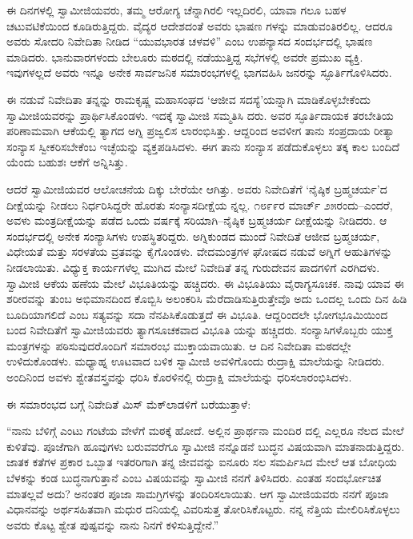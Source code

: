 ಈ ದಿನಗಳಲ್ಲಿ ಸ್ವಾಮೀಜಿಯವರು, ತಮ್ಮ ಆರೋಗ್ಯ ಚೆನ್ನಾಗಿರಲಿ ಇಲ್ಲದಿರಲಿ, ಯಾವಾ ಗಲೂ ಬಹಳ ಚಟುವಟಿಕೆಯಿಂದ ಕೂಡಿರುತ್ತಿದ್ದರು. ವೈದ್ಯರ ಆದೇಶದಂತೆ ಅವರು ಭಾಷಣ ಗಳನ್ನು ಮಾಡುವಂತಿರಲಿಲ್ಲ. ಆದರೂ ಅವರು ಸೋದರಿ ನಿವೇದಿತಾ ನೀಡಿದ “ಯುವಭಾರತ ಚಳವಳಿ” ಎಂಬ ಉಪನ್ಯಾಸದ ಸಂದರ್ಭದಲ್ಲಿ ಭಾಷಣ ಮಾಡಿದರು. ಭಾನುವಾರಗಳಂದು ಬೇಲೂರು ಮಠದಲ್ಲಿ ನಡೆಯುತ್ತಿದ್ದ ಸಭೆಗಳಲ್ಲಿ ಅವರೇ ಪ್ರಮುಖ ವ್ಯಕ್ತಿ. ಇವುಗಳಲ್ಲದೆ ಅವರು ಇನ್ನೂ ಅನೇಕ ಸಾರ್ವಜನಿಕ ಸಮಾರಂಭಗಳಲ್ಲಿ ಭಾಗವಹಿಸಿ ಜನರನ್ನು ಸ್ಫೂರ್ತಿಗೊಳಿಸಿದರು.

ಈ ನಡುವೆ ನಿವೇದಿತಾ ತನ್ನನ್ನು ರಾಮಕೃಷ್ಣ ಮಹಾಸಂಘದ ‘ಆಜೀವ ಸದಸ್ಯೆ’ಯನ್ನಾಗಿ ಮಾಡಿಕೊಳ್ಳಬೇಕೆಂದು ಸ್ವಾಮೀಜಿಯವರನ್ನು ಪ್ರಾರ್ಥಿಸಿಕೊಂಡಳು. ಇದಕ್ಕೆ ಸ್ವಾಮೀಜಿ ಸಮ್ಮತಿಸಿ ದರು. ಅವರ ಸ್ಫೂರ್ತಿದಾಯಕ ತರಬೇತಿಯ ಪರಿಣಾಮವಾಗಿ ಆಕೆಯಲ್ಲಿ ತ್ಯಾಗದ ಅಗ್ನಿ ಪ್ರಜ್ವಲಿಸ ಲಾರಂಭಿಸಿತ್ತು. ಆದ್ದರಿಂದ ಅವಳೀಗ ತಾನು ಸಂಪ್ರದಾಯ ರೀತ್ಯಾ ಸಂನ್ಯಾಸ ಸ್ವೀಕರಿಸಬೇಕೆಂಬ ಇಚ್ಛೆಯನ್ನು ವ್ಯಕ್ತಪಡಿಸಿದಳು. ಈಗ ತಾನು ಸಂನ್ಯಾಸ ಪಡೆದುಕೊಳ್ಳಲು ತಕ್ಕ ಕಾಲ ಬಂದಿದೆ ಯೆಂದು ಬಹುಶಃ ಆಕೆಗೆ ಅನ್ನಿಸಿತ್ತು.

ಆದರೆ ಸ್ವಾಮೀಜಿಯವರ ಆಲೋಚನೆಯ ದಿಕ್ಕು ಬೇರೆಯೇ ಆಗಿತ್ತು. ಅವರು ನಿವೇದಿತೆಗೆ ‘ನೈಷ್ಠಿಕ ಬ್ರಹ್ಮಚರ್ಯ’ದ ದೀಕ್ಷೆಯನ್ನು ನೀಡಲು ನಿರ್ಧರಿಸಿದ್ದರೇ ಹೊರತು ಸಂನ್ಯಾಸದೀಕ್ಷೆಯ ನ್ನಲ್ಲ. ೧೮೯೯ರ ಮಾರ್ಚ್ ೨೫ರಂದು–ಎಂದರೆ, ಅವಳು ಮಂತ್ರದೀಕ್ಷೆಯನ್ನು ಪಡೆದ ಒಂದು ವರ್ಷಕ್ಕೆ ಸರಿಯಾಗಿ–ನೈಷ್ಠಿಕ ಬ್ರಹ್ಮಚರ್ಯ ದೀಕ್ಷೆಯನ್ನು ನೀಡಿದರು. ಆ ಸಂದರ್ಭದಲ್ಲಿ ಅನೇಕ ಸಂನ್ಯಾಸಿಗಳು ಉಪಸ್ಥಿತರಿದ್ದರು. ಅಗ್ನಿಕುಂಡದ ಮುಂದೆ ನಿವೇದಿತೆ ಆಜೀವ ಬ್ರಹ್ಮಚರ್ಯ, ವಿಧೇಯತೆ ಮತ್ತು ಸರಳತೆಯ ವ್ರತವನ್ನು ಕೈಗೊಂಡಳು. ವೇದಮಂತ್ರಗಳ ಘೋಷದ ನಡುವೆ ಅಗ್ನಿಗೆ ಆಹುತಿಗಳನ್ನು ನೀಡಲಾಯಿತು. ವಿಧ್ಯುಕ್ತ ಕಾರ್ಯಗಳೆಲ್ಲ ಮುಗಿದ ಮೇಲೆ ನಿವೇದಿತೆ ತನ್ನ ಗುರುದೇವನ ಪಾದಗಳಿಗೆ ಎರಗಿದಳು. ಸ್ವಾಮೀಜಿ ಆಕೆಯ ಹಣೆಯ ಮೇಲೆ ವಿಭೂತಿಯನ್ನು ಹಚ್ಚಿದರು. ಈ ವಿಭೂತಿಯು ವೈರಾಗ್ಯಸೂಚಕ. ನಾವು ಯಾವ ಈ ಶರೀರವನ್ನು ತುಂಬ ಅಭಿಮಾನದಿಂದ ಕೊಬ್ಬಿಸಿ ಅಲಂಕರಿಸಿ ಮೆರೆದಾಡಿಸುತ್ತಿರುತ್ತೇವೊ ಅದು ಒಂದಲ್ಲ ಒಂದು ದಿನ ಹಿಡಿ ಬೂದಿಯಾಗಲಿದೆ ಎಂಬ ಸತ್ಯವನ್ನು ಸದಾ ನೆನಪಿಸಿಕೊಡುತ್ತದೆ ಈ ವಿಭೂತಿ. ಆದ್ದರಿಂದಲೇ ಭೋಗಭೂಮಿಯಿಂದ ಬಂದ ನಿವೇದಿತೆಗೆ ಸ್ವಾಮೀಜಿಯವರು ತ್ಯಾಗಸೂಚಕವಾದ ವಿಭೂತಿ ಯನ್ನು ಹಚ್ಚಿದರು. ಸಂನ್ಯಾಸಿಗಳೊಬ್ಬರು ಯುಕ್ತ ಮಂತ್ರಗಳನ್ನು ಪಠಿಸುವುದರೊಂದಿಗೆ ಸಮಾರಂಭ ಮುಕ್ತಾಯವಾಯಿತು. ಆ ದಿನ ನಿವೇದಿತಾ ಮಠದಲ್ಲೇ ಉಳಿದುಕೊಂಡಳು. ಮಧ್ಯಾಹ್ನ ಊಟವಾದ ಬಳಿಕ ಸ್ವಾಮೀಜಿ ಅವಳಿಗೊಂದು ರುದ್ರಾಕ್ಷಿ ಮಾಲೆಯನ್ನು ನೀಡಿದರು. ಅಂದಿನಿಂದ ಅವಳು ಶ್ವೇತವಸ್ತ್ರವನ್ನು ಧರಿಸಿ ಕೊರಳಿನಲ್ಲಿ ರುದ್ರಾಕ್ಷಿ ಮಾಲೆಯನ್ನು ಧರಿಸಲಾರಂಭಿಸಿದಳು.

ಈ ಸಮಾರಂಭದ ಬಗ್ಗೆ ನಿವೇದಿತೆ ಮಿಸ್ ಮೆಕ್​ಲಾಡಳಿಗೆ ಬರೆಯುತ್ತಾಳೆ:

“ನಾನು ಬೆಳಿಗ್ಗೆ ಎಂಟು ಗಂಟೆಯ ವೇಳೆಗೆ ಮಠಕ್ಕೆ ಹೋದೆ. ಅಲ್ಲಿನ ಪ್ರಾರ್ಥನಾ ಮಂದಿರ ದಲ್ಲಿ ಎಲ್ಲರೂ ನೆಲದ ಮೇಲೆ ಕುಳಿತೆವು. ಪೂಜೆಗಾಗಿ ಹೂವುಗಳು ಬರುವವರೆಗೂ ಸ್ವಾಮೀಜಿ ನನ್ನೊಡನೆ ಬುದ್ಧನ ವಿಷಯವಾಗಿ ಮಾತನಾಡುತ್ತಿದ್ದರು. ಜಾತಕ ಕತೆಗಳ ಪ್ರಕಾರ ಒಬ್ಬಾತ ಇತರರಿಗಾಗಿ ತನ್ನ ಜೀವವನ್ನು ಐನೂರು ಸಲ ಸಮರ್ಪಿಸಿದ ಮೇಲೆ ಆತ ಬೋಧಿಯ ಬೆಳಕನ್ನು ಕಂಡ ಬುದ್ಧನಾಗುತ್ತಾನೆ ಎಂಬ ವಿಷಯವನ್ನು ಸ್ವಾಮೀಜಿ ನನಗೆ ತಿಳಿಸಿದರು. ಎಂತಹ ಸಂದರ್ಭೋಚಿತ ಮಾತಲ್ಲವೆ ಅದು? ಅನಂತರ ಪೂಜಾ ಸಾಮಗ್ರಿಗಳನ್ನು ತಂದಿರಿಸಲಾಯಿತು. ಆಗ ಸ್ವಾಮೀಜಿಯವರು ನನಗೆ ಪೂಜಾ ವಿಧಾನವನ್ನು ಅರ್ಥಸಹಿತವಾಗಿ ಮಧುರ ದನಿಯಲ್ಲಿ ವಿವರಿಸುತ್ತ ತೋರಿಸಿಕೊಟ್ಟರು. ನನ್ನ ನೆತ್ತಿಯ ಮೇಲಿರಿಸಿಕೊಳ್ಳಲು ಅವರು ಕೊಟ್ಟ ಶ್ವೇತ ಪುಷ್ಪವನ್ನು ನಾನು ನಿನಗೆ ಕಳಿಸುತ್ತಿದ್ದೇನೆ.”

